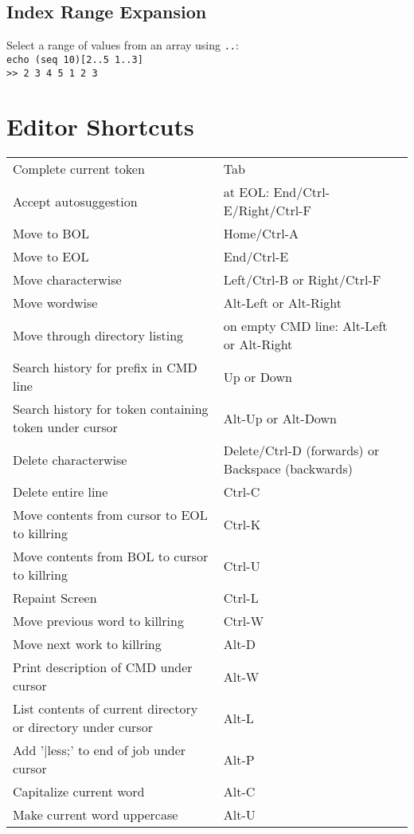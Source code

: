 \documentclass[10pt]{extarticle}
\begin{document}
\begin{paracol}{2}
\subsection*{Index Range Expansion}

Select a range of values from an array using \texttt{..}:\\
\texttt{echo (seq 10)[2..5 1..3]}\\
\texttt{>> 2 3 4 5 1 2 3}

\switchcolumn

\section*{Editor Shortcuts}

\begin{tabularx}{\columnwidth}{X >{\ttfamily}X}
    Complete current token & Tab \\
    Accept autosuggestion & at EOL: End/Ctrl-E/Right/Ctrl-F \\
    Move to BOL & Home/Ctrl-A \\
    Move to EOL & End/Ctrl-E \\
    Move characterwise & Left/Ctrl-B or Right/Ctrl-F \\
    Move wordwise & Alt-Left or Alt-Right \\
    Move through directory listing & on empty CMD line: Alt-Left or Alt-Right \\
    Search history for prefix in CMD line & Up or Down \\
    Search history for token containing token under cursor & Alt-Up or Alt-Down \\
    Delete characterwise & Delete/Ctrl-D (forwards) or Backspace (backwards) \\
    Delete entire line & Ctrl-C \\
    Move contents from cursor to EOL to killring & Ctrl-K \\
    Move contents from BOL to cursor to killring & Ctrl-U \\
    Repaint Screen & Ctrl-L \\
    Move previous word to killring & Ctrl-W \\
    Move next work to killring & Alt-D \\
    Print description of CMD under cursor & Alt-W \\
    List contents of current directory or directory under cursor & Alt-L \\
    Add '|less;' to end of job under cursor & Alt-P \\
    Capitalize current word & Alt-C \\
    Make current word uppercase & Alt-U
\end{tabularx}

\end{paracol}
\end{document}

